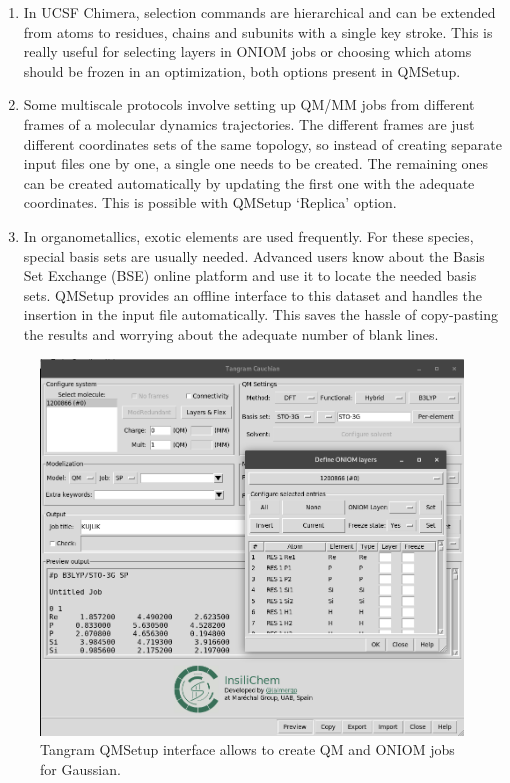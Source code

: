 \begin{enumerate}
	\item In UCSF Chimera, selection commands are hierarchical and can be extended from atoms to residues, chains and subunits with a single key stroke. This is really useful for selecting layers in ONIOM jobs or choosing which atoms should be frozen in an optimization, both options present in QMSetup.

	\item Some multiscale protocols involve setting up QM/MM jobs from different frames of a molecular dynamics trajectories. The different frames are just different coordinates sets of the same topology, so instead of creating separate input files one by one, a single one needs to be created. The remaining ones can be created automatically by updating the first one with the adequate coordinates. This is possible with QMSetup ‘Replica’ option.

	\item In organometallics, exotic elements are used frequently. For these species, special basis sets are usually needed. Advanced users know about the Basis Set Exchange (BSE)\cite{schuchardt2007basis} online platform and use it to locate the needed basis sets. QMSetup provides an offline interface to this dataset and handles the insertion in the input file automatically. This saves the hassle of copy-pasting the results and worrying about the adequate number of blank lines.
\end{enumerate}



\begin{figure}
	\begin{Center}
		\includegraphics[width=\textwidth]{./figures/05/tangram_qm.png}
	\end{Center}
	\caption[Tangram QMSetup]{Tangram QMSetup interface allows to create QM and ONIOM jobs for Gaussian.}
	\label{fig:tangram-qmsetup}
\end{figure}



